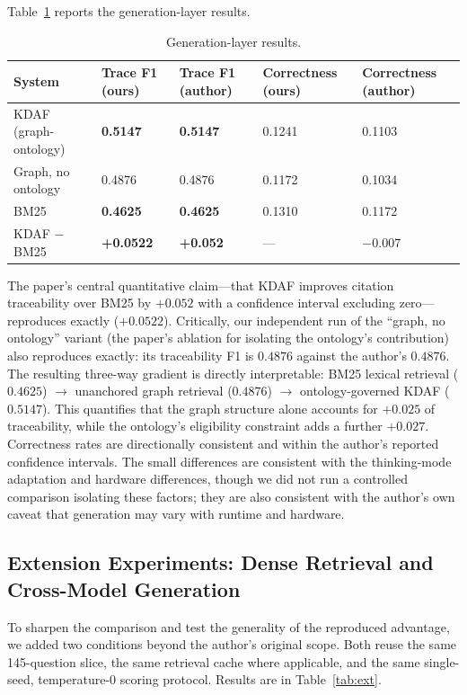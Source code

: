 \documentclass[11pt]{article}
\begin{document}
Table~\ref{tab:gen} reports the generation-layer results.

\begin{table}[h]
\centering
\caption{Generation-layer results.}
\label{tab:gen}
\small
\begin{tabular}{@{}l l l l l@{}}
\toprule
\textbf{System} & \textbf{Trace F1 (ours)} & \textbf{Trace F1 (author)} & \textbf{Correctness (ours)} & \textbf{Correctness (author)} \\
\midrule
KDAF (graph-ontology) & \textbf{0.5147} & \textbf{0.5147} & 0.1241 & 0.1103 \\
Graph, no ontology & 0.4876 & 0.4876 & 0.1172 & 0.1034 \\
BM25 & \textbf{0.4625} & \textbf{0.4625} & 0.1310 & 0.1172 \\
KDAF $-$ BM25 & \textbf{+0.0522} & \textbf{+0.052} & ---  & $-0.007$ \\
\bottomrule
\end{tabular}
\end{table}

The paper's central quantitative claim---that KDAF improves citation traceability over BM25 by $+0.052$ with a confidence interval excluding zero---reproduces exactly ($+0.0522$). Critically, our independent run of the ``graph, no ontology'' variant (the paper's ablation for isolating the ontology's contribution) also reproduces exactly: its traceability F1 is $0.4876$ against the author's $0.4876$. The resulting three-way gradient is directly interpretable: BM25 lexical retrieval ($0.4625$) $\rightarrow$ unanchored graph retrieval ($0.4876$) $\rightarrow$ ontology-governed KDAF ($0.5147$). This quantifies that the graph structure alone accounts for $+0.025$ of traceability, while the ontology's eligibility constraint adds a further $+0.027$. Correctness rates are directionally consistent and within the author's reported confidence intervals. The small differences are consistent with the thinking-mode adaptation and hardware differences, though we did not run a controlled comparison isolating these factors; they are also consistent with the author's own caveat that generation may vary with runtime and hardware.

\subsection{Extension Experiments: Dense Retrieval and Cross-Model Generation}\label{sec:ext}

To sharpen the comparison and test the generality of the reproduced advantage, we added two conditions beyond the author's original scope. Both reuse the same 145-question slice, the same retrieval cache where applicable, and the same single-seed, temperature-0 scoring protocol. Results are in Table~\ref{tab:ext}.
\end{document}
